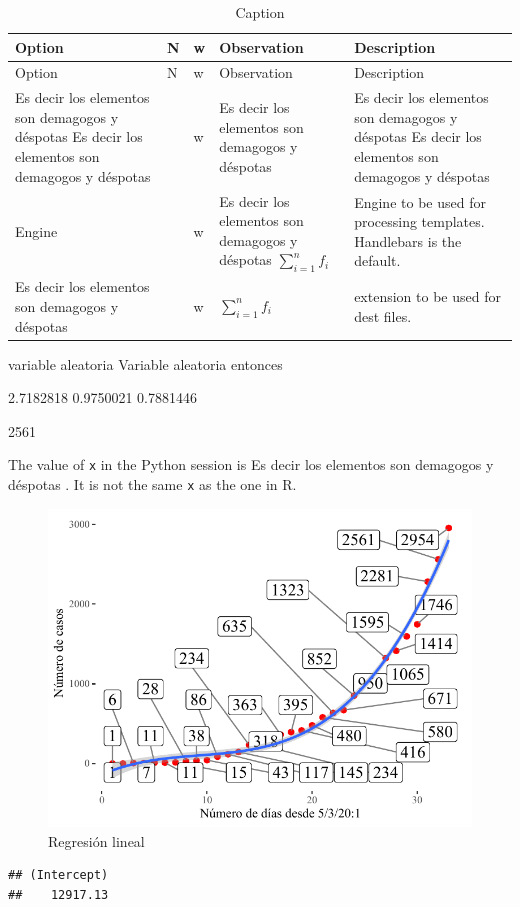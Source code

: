 \documentclass[
  11pt,
]{krantz}
\theoremstyle{definition}
\theoremstyle{definition}
\theoremstyle{definition}
\theoremstyle{definition}
\theoremstyle{remark}
\begin{document}
\begin{longtable}[]{@{}
  >{\raggedleft\arraybackslash}p{}
  >{\centering\arraybackslash}p{}
  >{\raggedright\arraybackslash}p{}
  >{\raggedleft\arraybackslash}p{}
  >{\raggedright\arraybackslash}p{}@{}}
\caption{\label{tab:ww1} Caption}\tabularnewline
\toprule
Option & N & w & Observation & Description \\
\midrule
\endfirsthead
\toprule
Option & N & w & Observation & Description \\
\midrule
\endhead
Es decir los elementos son demagogos y déspotas Es decir los elementos son demagogos y déspotas & 1 & w & Es decir los elementos son demagogos y déspotas & Es decir los elementos son demagogos y déspotas Es decir los elementos son demagogos y déspotas \\
Engine & 2 & w & Es decir los elementos son demagogos y déspotas \(\sum^{n}_{i=1}{f_i}\) & Engine to be used for processing templates. Handlebars is the default. \\
Es decir los elementos son demagogos y déspotas & 3 & w & \(\sum^{n}_{i=1}{f_i}\) & extension to be used for dest files. \\
\bottomrule
\end{longtable}

variable aleatoria Variable aleatoria entonces

2.7182818 0.9750021 0.7881446

2561

The value of \texttt{x} in the Python session is Es decir los elementos son demagogos y déspotas .
It is not the same \texttt{x} as the one in R.

\begin{figure}

{\centering \includegraphics{E_1_files/figure-latex/ww1w-1} 

}

\caption{Regresión lineal}\label{fig:ww1w}
\end{figure}

\begin{verbatim}
## (Intercept) 
##    12917.13
\end{verbatim}

  

\printindex
\end{document}
